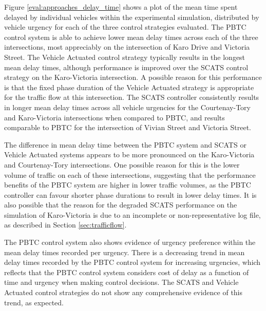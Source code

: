 Figure \ref{eval:approaches_delay_time} shows a plot of the mean time spent delayed by individual vehicles within the experimental simulation, distributed by vehicle urgency for each of the three control strategies evaluated. The PBTC control system is able to achieve lower mean delay times across each of the three intersections, most appreciably on the intersection of Karo Drive and Victoria Street. The Vehicle Actuated control strategy typically results in the longest mean delay times, although performance is improved over the SCATS control strategy on the Karo-Victoria intersection. A possible reason for this performance is that the fixed phase duration of the Vehicle Actuated strategy is appropriate for the traffic flow at this intersection. The SCATS controller consistently results in longer mean delay times across all vehicle urgencies for the Courtenay-Tory and Karo-Victoria intersections when compared to PBTC, and results comparable to PBTC for the intersection of Vivian Street and Victoria Street. 

The difference in mean delay time between the PBTC system and SCATS or Vehicle Actuated systems appears to be more pronounced on the Karo-Victoria and Courtenay-Tory intersections. One possible reason for this is the lower volume of traffic on each of these intersections, suggesting that the performance benefits of the PBTC system are higher in lower traffic volumes, as the PBTC controller can favour shorter phase durations to result in lower delay times. It is also possible that the reason for the degraded SCATS performance on the simulation of Karo-Victoria is due to an incomplete or non-representative log file, as described in Section \ref{sec:trafficflow}. 

The PBTC control system also shows evidence of urgency preference within the mean delay times recorded per urgency. There is a decreasing trend in mean delay times recorded by the PBTC control system for increasing urgencies, which reflects that the PBTC control system considers cost of delay as a function of time and urgency when making control decisions. The SCATS and Vehicle Actuated control strategies do not show any comprehensive evidence of this trend, as expected.

